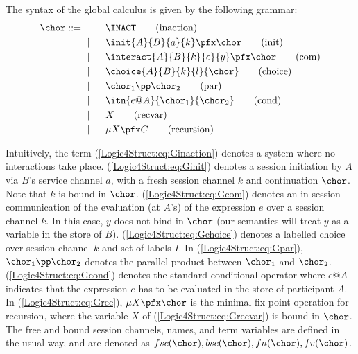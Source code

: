 \begin{definition}\label{Logic4Struct:definition:globalCalc}
  The syntax of the global calculus \cite{CHY:dcm2006} is given by the
  following grammar:
  \begin{alignat}{3}
    \chor ::= \ & \phantom{{}\mid{}}
    &\ & \INACT                          \label{Logic4Struct:eq:Ginaction} \tag{inaction} \\
    &\mid && \init{A}{B}{a}{k}\pfx \chor \label{Logic4Struct:eq:Ginit} \tag{init} \\
    &\mid && \interact{A}{B}{k}{e}{y}\pfx\chor  \label{Logic4Struct:eq:Gcom} \tag{com} \\
    &\mid && \choice{A}{B}{k}{l}{\chor}   \label{Logic4Struct:eq:Gchoice} \tag{choice} \\
    &\mid && \chor_1 \pp \chor_2          \label{Logic4Struct:eq:Gpar} \tag{par} \\
    &\mid && \itn{e@A}{\chor_1}{\chor_2}  \label{Logic4Struct:eq:Gcond} \tag{cond}\\
    &\mid && X                            \label{Logic4Struct:eq:Grecvar} \tag{recvar} \\
    &\mid && \mu X\pfx C                  \label{Logic4Struct:eq:Grec} \tag{recursion}
  \end{alignat}
\end{definition}
\NI Intuitively, the term (\ref{Logic4Struct:eq:Ginaction}) denotes a
system where no interactions take place. (\ref{Logic4Struct:eq:Ginit})
denotes a session initiation by $A$ via $B$'s service channel $a$,
with a fresh session channel $k$ and continuation $\chor$. Note that
$k$ is bound in $\chor$.  (\ref{Logic4Struct:eq:Gcom}) denotes an
in-session communication of the evaluation (at $A$'s) of the
expression $e$ over a session channel $k$. In this case, $y$ does not
bind in $\chor$ (our semantics will treat $y$ as a variable in the
store of $B$).  (\ref{Logic4Struct:eq:Gchoice}) denotes a labelled
choice over session channel $k$ and set of labels $I$. In
(\ref{Logic4Struct:eq:Gpar}), $\chor_1 \pp \chor_2$ denotes the
parallel product between $\chor_1$ and $\chor_2$.
(\ref{Logic4Struct:eq:Gcond}) denotes the standard conditional
operator where $e@A$ indicates that the expression $e$ has to be
evaluated in the store of participant $A$.  In
(\ref{Logic4Struct:eq:Grec}), $\mu X\pfx\chor$ is the minimal fix
point operation for recursion, where the variable $X$ of
(\ref{Logic4Struct:eq:Grecvar}) is bound in $\chor$.  The free and
bound session channels, names, and term variables are defined in the
usual way, and are denoted as $fsc(\chor), bsc(\chor), fn(\chor),
fv(\chor)$.  

